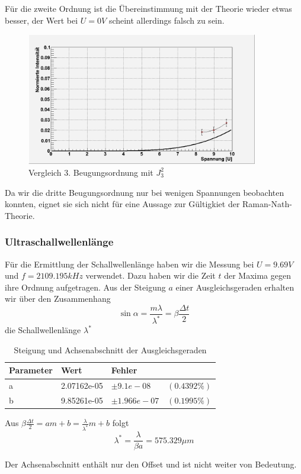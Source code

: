 Für die zweite Ordnung ist die Übereinstimmung mit der Theorie wieder etwas besser, der Wert bei $U=0V$ scheint allerdings falsch zu sein.
\begin{figure}[H]
 \includegraphics[width=0.9\textwidth]{Bilder/raman/raman-fit_3.png}
 \caption{Vergleich 3. Beugungsordnung mit $J_3^2$}
\end{figure}
Da wir die dritte Beugungsordnung nur bei wenigen Spannungen beobachten konnten, eignet sie sich nicht für eine Aussage zur Gültigkiet der Raman-Nath-Theorie.

\subsubsection{Ultraschallwellenlänge}

Für die Ermittlung der Schallwellenlänge haben wir die Messung bei $ U = 9.69 V$ und $f = 2109.195 kHz $ verwendet. Dazu haben wir die Zeit $t$ der Maxima gegen ihre Ordnung aufgetragen. Aus der Steigung $a$ einer Ausgleichsgeraden erhalten wir über den Zusammenhang 
$$ \sin \alpha = \frac{m \lambda}{\lambda^{*}} = \beta \frac{\Delta t}{2} $$
 die Schallwellenlänge $ \lambda^* $


\begin{table}[H]
\begin{center}
\caption{Steigung und Achsenabschnitt der Ausgleichsgeraden}
\begin{tabular}{llll}
\toprule
Parameter & Wert & Fehler & \\
\midrule
a & 2.07162e-05   &  $ \pm 9.1e-08$  &    $(0.4392\%)$\\
b & 9.85261e-05 & $ \pm 1.966e-07$ &   $(0.1995\%)$ \\
\bottomrule
\end{tabular}
\end{center}
\end{table}


Aus $ \beta \frac{\Delta t}{2} = a m + b = \frac{\lambda}{\lambda^*} m + b $ folgt 
$$\boxed{ \lambda^* = \frac{\lambda}{\beta a} = 575.329 \mu m}$$

Der Achsenabschnitt enthält nur den Offset und ist nicht weiter von Bedeutung. 















